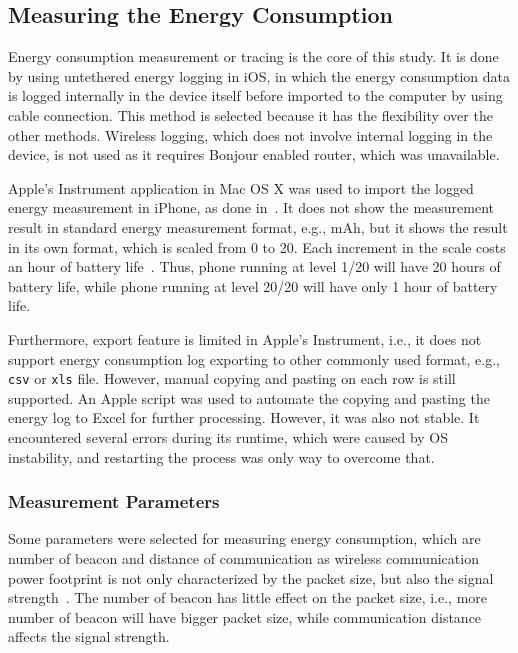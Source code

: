 \documentclass[journal]{vgtc}                %
\begin{document}
\subsection{Measuring the Energy Consumption} %
\label{sub:tracing_}
Energy consumption measurement or tracing is the core of this study. It is done by using untethered energy logging in iOS, in which the energy consumption data is logged internally in the device itself before imported to the computer by using cable connection. This method is selected because it has the flexibility over the other methods. Wireless logging, which does not involve internal logging in the device, is not used as it requires Bonjour enabled router, which was unavailable.

Apple's Instrument application in Mac OS X was used to import the logged energy measurement in iPhone, as done in~\cite{Conte2014}. It does not show the measurement result in standard energy measurement format, e.g., mAh, but it shows the result in its own format, which is scaled from 0 to 20. Each increment in the scale costs an hour of battery life~\cite{Lucchesi2014}. Thus, phone running at level 1/20 will have 20 hours of battery life, while phone running at level 20/20 will have only 1 hour of battery life.

Furthermore, export feature is limited in Apple's Instrument, i.e., it does not support energy consumption log exporting to other commonly used format, e.g., \texttt{csv} or \texttt{xls} file. However, manual copying and pasting on each row is still supported. An Apple script was used to automate the copying and pasting the energy log to Excel for further processing. However, it was also not stable. It encountered several errors during its runtime, which were caused by OS instability, and restarting the process was only way to overcome that.

\subsubsection{Measurement Parameters} %
\label{ssub:measurement_parameters}
Some parameters were selected for measuring energy consumption, which are number of beacon and distance of communication as wireless communication power footprint is not only characterized by the packet size, but also the signal strength~\cite{Vergara2012}. The number of beacon has little effect on the packet size, i.e., more number of beacon will have bigger packet size, while communication distance affects the signal strength.
\end{document}
